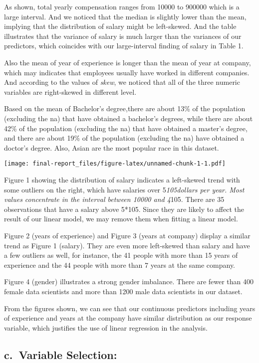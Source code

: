 \documentclass[
]{article}
\begin{document}
As shown, total yearly compensation ranges from 10000 to 900000 which is
a large interval. And we noticed that the median is slightly lower than
the mean, implying that the distribution of salary might be left-skewed.
And the table illustrates that the variance of salary is much larger
than the variances of our predictors, which coincides with our
large-interval finding of salary in Table 1.

Also the mean of year of experience is longer than the mean of year at
company, which may indicates that employees usually have worked in
different companies. And according to the values of \emph{skew}, we
noticed that all of the three numeric variables are right-skewed in
different level.

Based on the mean of Bachelor's degree,there are about 13\% of the
population (excluding the na) that have obtained a bachelor's degrees,
while there are about 42\% of the population (excluding the na) that
have obtained a master's degree, and there are about 19\% of the
population (excluding the na) have obtained a doctor's degree. Also,
Asian are the most popular race in this dataset.

\texttt{[image: final-report\_files/figure-latex/unnamed-chunk-1-1.pdf]}

Figure 1 showing the distribution of salary indicates a left-skewed
trend with some outliers on the right, which have salaries over
5\emph{105dollars per year. Most values concentrate in the interval
between 10000 and 4}105. There are 35 observations that have a salary
above 5*105. Since they are likely to affect the result of our linear
model, we may remove them when fitting a linear model.

Figure 2 (years of experience) and Figure 3 (years at company) display a
similar trend as Figure 1 (salary). They are even more left-skewed than
salary and have a few outliers as well, for instance, the 41 people with
more than 15 years of experience and the 44 people with more than 7
years at the same company.

Figure 4 (gender) illustrates a strong gender imbalance. There are fewer
than 400 female data scientists and more than 1200 male data scientists
in our dataset.

From the figures shown, we can see that our continuous predictors
including years of experience and years at the company have similar
distribution as our response variable, which justifies the use of linear
regression in the analysis.

\hypertarget{c.-variable-selection}{%
\subsection{c.~Variable Selection:}\label{c.-variable-selection}}
\end{document}
